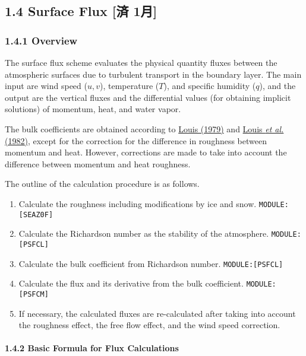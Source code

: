 \hypertarget{surface-flux-ux6e08-1ux6708}{%
\subsection{1.4 Surface Flux {[}済
1月{]}}\label{surface-flux-ux6e08-1ux6708}}

\hypertarget{overview}{%
\subsubsection{1.4.1 Overview}\label{overview}}

The surface flux scheme evaluates the physical quantity fluxes between
the atmospheric surfaces due to turbulent transport in the boundary
layer. The main input \textbar{} are wind speed (\(u, v\)), temperature
(\(T\)), and specific humidity (\(q\)), and the output \textbar{} are
the vertical fluxes and the differential values (for obtaining implicit
solutions) of momentum, heat, and water vapor.

The bulk coefficients are obtained according to
\href{./papers/Louis1979_Article_AParametricModelOfVerticalEddy.pdf}{Louis
(1979)} and
\href{./papers/Louis1982_a_short_history_of_the_operational_pbl_parameterization_at_ecmwf.pdf}{Louis
{\emph{et al.}}(1982)}, except for the correction for the difference in
roughness between momentum and heat. However, corrections are made to
take into account the difference between momentum and heat roughness.

The outline of the calculation procedure is as follows.

\begin{enumerate}
\def\labelenumi{\arabic{enumi}.}
\tightlist
\item
  Calculate the roughness including modifications by ice and snow.
  \texttt{MODULE:{[}SEAZ0F{]}}
\item
  Calculate the Richardson number as the stability of the atmosphere.
  \texttt{MODULE:{[}PSFCL{]}}
\item
  Calculate the bulk coefficient from Richardson number.
  \texttt{MODULE:{[}PSFCL{]}}
\item
  Calculate the flux and its derivative from the bulk coefficient.
  \texttt{MODULE:{[}PSFCM{]}}
\item
  If necessary, the calculated fluxes are re-calculated after taking
  into account the roughness effect, the free flow effect, and the wind
  speed correction.
\end{enumerate}

\hypertarget{basic-formula-for-flux-calculations}{%
\paragraph{1.4.2 Basic Formula for Flux
Calculations}\label{basic-formula-for-flux-calculations}}

